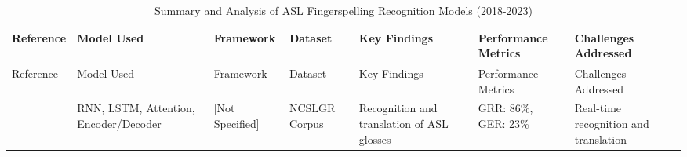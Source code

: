 
\begin{footnotesize}
    \begin{longtable}{LLLLLLL} %
        \caption{Summary and Analysis of ASL Fingerspelling Recognition Models (2018-2023)}
        \label{table:asl-comparison}                                                                                                                                                                                                                                                                                                                                                                                                                                                                                                                                                                                                          \\
        \toprule
        Reference                                          & Model Used                                                                                                            & Framework                & Dataset                        & Key Findings                                                                                                                                              & Performance Metrics                                    & Challenges Addressed                                                                                                                                                    \\
        \midrule
        \endfirsthead
        \toprule
        Reference                                          & Model Used                                                                                                            & Framework                & Dataset                        & Key Findings                                                                                                                                              & Performance Metrics                                    & Challenges Addressed                                                                                                                                                    \\
        \midrule
        \endhead
        \bottomrule
        \endfoot
        \endlastfoot
        \cite{skumarTimeSeriesNeural2018}                  & RNN, LSTM, Attention, Encoder/Decoder                                                                                 & [Not Specified]          & NCSLGR Corpus                  & Recognition and translation of ASL glosses                                                                                                                & GRR: 86\%, GER: 23\%                                   & Real-time recognition and translation                                                                                                                                   \\


\end{longtable}
\end{footnotesize}
